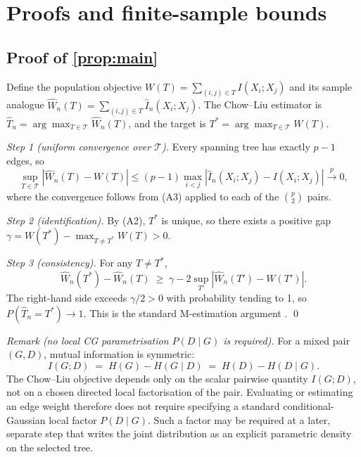 \appendix

\section{Proofs and finite-sample bounds}
\label{app:proofs}

\subsection*{Proof of \cref{prop:main}}

Define the population objective
$W(T) = \sum_{(i,j) \in T} I(X_i; X_j)$ and its sample analogue
$\hat{W}_n(T) = \sum_{(i,j) \in T} \hat{I}_n(X_i; X_j)$. The Chow--Liu
estimator is $\hat{T}_n = \arg\max_{T \in \mathcal{T}} \hat{W}_n(T)$,
and the target is $T^* = \arg\max_{T \in \mathcal{T}} W(T)$.

\emph{Step 1 (uniform convergence over $\mathcal{T}$).} Every spanning
tree has exactly $p - 1$ edges, so
\begin{equation*}
\sup_{T \in \mathcal{T}} |\hat{W}_n(T) - W(T)| \le (p-1)
\max_{i < j} |\hat{I}_n(X_i; X_j) - I(X_i; X_j)|
\overset{p}{\to} 0,
\end{equation*}
where the convergence follows from (A3) applied to each of the
$\binom{p}{2}$ pairs.

\emph{Step 2 (identification).} By (A2), $T^*$ is unique, so there
exists a positive gap
$\gamma = W(T^*) - \max_{T \ne T^*} W(T) > 0$.

\emph{Step 3 (consistency).} For any $T \ne T^*$,
\begin{equation*}
\hat{W}_n(T^*) - \hat{W}_n(T) \;\ge\; \gamma - 2 \sup_{T'}
|\hat{W}_n(T') - W(T')|.
\end{equation*}
The right-hand side exceeds $\gamma/2 > 0$ with probability tending
to 1, so $P(\hat{T}_n = T^*) \to 1$. This is the standard M-estimation
argument \citep{vandervaart2000asymptotic}. \qed

\medskip
\noindent\emph{Remark (no local CG parametrisation $P(D \mid G)$ is
required).} For a mixed pair $(G, D)$, mutual information is
symmetric:
\begin{equation}
I(G; D) \;=\; H(G) - H(G \mid D) \;=\; H(D) - H(D \mid G).
\label{eq:identity}
\end{equation}
The Chow--Liu objective depends only on the scalar pairwise quantity
$I(G; D)$, not on a chosen directed local factorisation of the pair.
Evaluating or estimating an edge weight therefore does not require
specifying a standard conditional-Gaussian local factor $P(D \mid
G)$. Such a factor may be required at a later, separate step that
writes the joint distribution as an explicit parametric density on
the selected tree.

